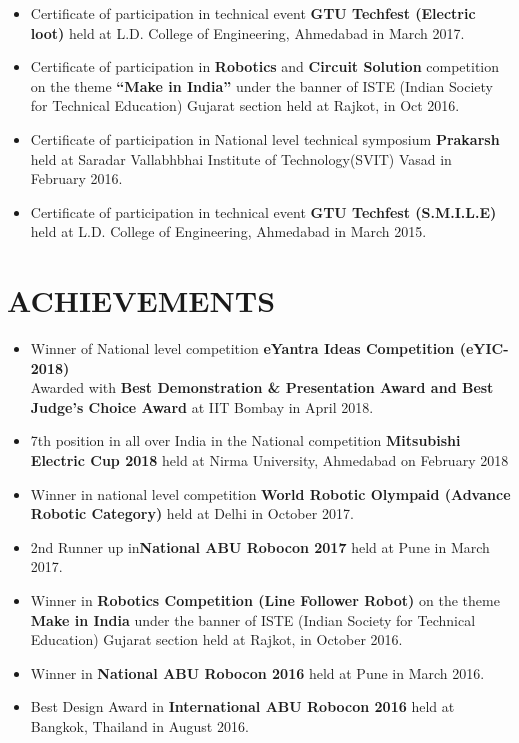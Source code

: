 \documentclass{res}
\begin{document}
\begin{resume}
\begin{itemize}
\item Certificate of participation in technical event \textbf {GTU Techfest (Electric loot)} held at L.D. College of Engineering, Ahmedabad in March 2017.
\item Certificate of participation in \textbf {Robotics} and \textbf {Circuit Solution} competition on the theme \textbf{“Make in India”} under the banner of ISTE (Indian Society for Technical Education) Gujarat section held at Rajkot, in Oct 2016.
\item Certificate of participation in National level technical symposium \textbf{Prakarsh} held at Saradar Vallabhbhai Institute of Technology(SVIT) Vasad in February 2016.
\item Certificate of participation in technical event \textbf {GTU Techfest (S.M.I.L.E)} held at L.D. College of Engineering, Ahmedabad in March 2015.
\end{itemize}
        


\section{ACHIEVEMENTS}
\begin{itemize}\itemsep -2pt  %
\item  Winner of National level competition \textbf {eYantra Ideas Competition (eYIC-2018)} \\  Awarded with \textbf{Best Demonstration \& Presentation Award and  Best Judge’s Choice Award } at IIT Bombay in April 2018.

\item 7th position in all over India in the National competition \textbf {Mitsubishi Electric Cup 2018} held at Nirma University, Ahmedabad on February 2018 
\item Winner in national level competition \textbf {World Robotic Olympaid (Advance Robotic Category)} held at Delhi in October 2017.
\item 2nd Runner up in\textbf {National ABU Robocon 2017} held at Pune in March 2017.
\item Winner in \textbf {Robotics Competition (Line Follower Robot)} on the theme \textbf {Make in India} under the banner of ISTE (Indian Society for Technical Education) Gujarat section held at Rajkot, in October 2016.   
\item Winner in \textbf {National ABU Robocon 2016} held at Pune in March 2016.
\item Best Design Award in \textbf {International ABU Robocon 2016} held at Bangkok, Thailand in August 2016.


\end{itemize}
\end{resume}
\end{document}
